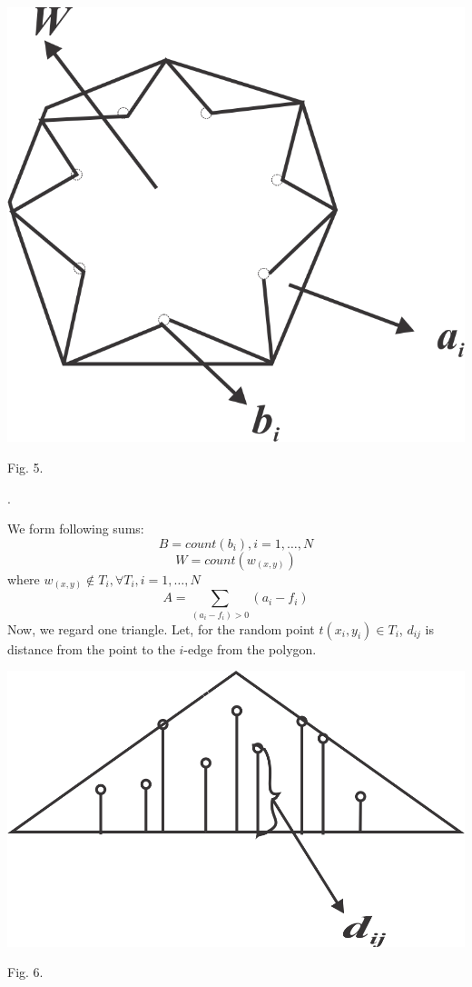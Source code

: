 \documentclass[11pt,leqno]{book}
\begin{document}
\begin{center}
\includegraphics{pic05.png}

Fig. 5.
\label{fig5}
\end{center}.

We form following sums:
$$B= count( b_i), i =1, \ldots, N$$
$$ W= count(w_{(x,y)})$$ where $w_{ (x,y)}\notin T_i, \forall{ T_i}, i=1, \dots, N$
$$ A= \sum_{(a_i - f_i)>0}(a_i-f_i)$$
Now, we regard one triangle.  Let, for the random point $t(x_i, y_i) \in T_i$,  $d_{ij}$  is distance from the point to the $i$-edge from the polygon. 

\begin{center}
\includegraphics{pic06.png}

Fig. 6.
\label{fig5}
\end{center}
\end{document}
